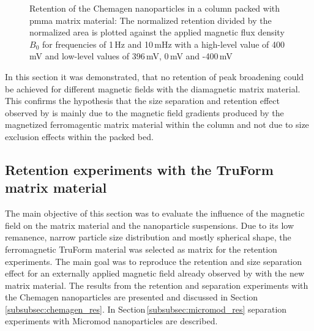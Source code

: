 \begin{figure}
\centering
{}
\caption[]{Retention of the Chemagen nanoparticles in a column packed with \gls{pmma} matrix material: The normalized retention divided by the normalized area is plotted against the applied magnetic flux density $B_{0}$ for frequencies of 1\,Hz and 10\,mHz with a high-level value of 400\,mV and low-level values of 396\,mV, 0\,mV and -400\,mV 
\label{fig:norm_ret_PMMA}
}
\end{figure}

In this section it was demonstrated, that no retention of peak broadening could be achieved for different magnetic fields with the diamagnetic matrix material. This confirms the hypothesis that the size separation and retention effect observed by \cite{AndreMaster} is mainly due to the magnetic field gradients produced by the magnetized ferromagentic matrix material within the column and not due to size exclusion effects within the packed bed.

\FloatBarrier
\subsection{Retention experiments with the TruForm matrix material}
\label{subsec:trufrom_res}
The main objective of this section was to evaluate the influence of the magnetic field on the matrix material and the nanoparticle suspensions. Due to its low remanence, narrow particle size distribution and mostly spherical shape, the ferromagnetic TruForm material was selected as matrix for the retention experiments. The main goal was to reproduce the retention and size separation effect for an externally applied magnetic field already observed by \cite{AndreMaster} with the new matrix material. The results from the retention and separation experiments with the Chemagen nanoparticles are presented and discussed in Section\,\ref{subsubsec:chemagen_res}. In Section\,\ref{subsubsec:micromod_res} separation experiments with Micromod nanoparticles are described.   

